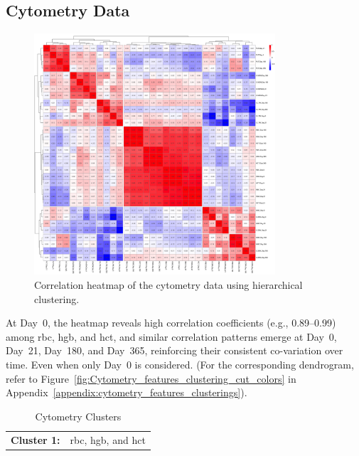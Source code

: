 \documentclass[12pt,a4paper]{report}
\begin{document}
\subsection{Cytometry Data}

\begin{figure}[H]
  \centering
  \includegraphics[width=0.8\textwidth]{images/Cytometry_euclidean_distance.png}
  \caption[cytometry data correlations]{Correlation heatmap of the cytometry data using hierarchical clustering.}
  \label{fig:cytometry_heatmap}
\end{figure}
\noindent
At Day~0, the heatmap reveals high correlation coefficients (e.g., 0.89--0.99) among \acrshort{rbc}, \acrshort{hgb}, and \acrshort{hct}, and similar correlation patterns emerge at Day~0, Day~21, Day~180, and Day~365, reinforcing their consistent co-variation over time. Even when only Day~0 is considered. (For the corresponding dendrogram, refer to Figure~\ref{fig:Cytometry_features_clustering_cut_colors} in Appendix~\ref{appendix:cytometry_features_clusterings}).
\begin{table}[h!]
    \centering
    \begin{tabular}{ll}
        \textbf{Cluster 1:} &  \acrshort{rbc}, \acrshort{hgb}, and \acrshort{hct}
    \end{tabular}
    \caption{Cytometry Clusters}
    \label{tab:cytometry_clusters}
\end{table}
\end{document}
